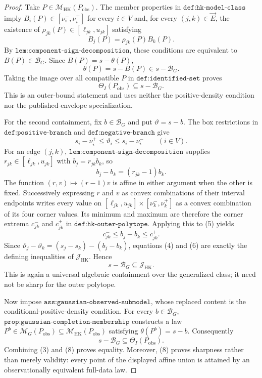 \documentclass{article}
\begin{document}
\begin{proof}
Take \(P\in\mathcal M_{\mathrm{HK}}(P_{\mathrm{obs}})\).  The member properties in \(\texttt{def:hk-model-class}\) imply \(B_i(P)\in[\nu_i^-,\nu_i^+]\) for every \(i\in V\) and, for every \((j,k)\in\vec E\), the existence of \(\rho_{jk}(P)\in[\ell_{jk},u_{jk}]\) satisfying
\[
B_j(P)=\rho_{jk}(P)B_k(P). \tag{1}
\]
By \(\texttt{lem:component-sign-decomposition}\), these conditions are equivalent to \(B(P)\in\mathcal B_G\).  Since \(B(P)=s-\theta(P)\),
\[
\theta(P)=s-B(P)\in s-\mathcal B_G. \tag{2}
\]
Taking the image over all compatible \(P\) in \(\texttt{def:identified-set}\) proves
\[
\Theta_I(P_{\mathrm{obs}})\subseteq s-\mathcal B_G. \tag{3}
\]
This is an outer-bound statement and uses neither the positive-density condition nor the published-envelope specialization.

For the second containment, fix \(b\in\mathcal B_G\) and put \(\vartheta=s-b\).  The box restrictions in \(\texttt{def:positive-branch}\) and \(\texttt{def:negative-branch}\) give
\[
s_i-\nu_i^+\le \vartheta_i\le s_i-\nu_i^-\qquad(i\in V). \tag{4}
\]
For an edge \((j,k)\), \(\texttt{lem:component-sign-decomposition}\) supplies \(r_{jk}\in[\ell_{jk},u_{jk}]\) with \(b_j=r_{jk}b_k\), so
\[
b_j-b_k=(r_{jk}-1)b_k. \tag{5}
\]
The function \((r,v)\mapsto(r-1)v\) is affine in either argument when the other is fixed.  Successively expressing \(r\) and \(v\) as convex combinations of their interval endpoints writes every value on \([\ell_{jk},u_{jk}]\times[\nu_k^-,\nu_k^+]\) as a convex combination of its four corner values.  Its minimum and maximum are therefore the corner extrema \(c_{jk}^-\) and \(c_{jk}^+\) in \(\texttt{def:hk-outer-polytope}\).  Applying this to (5) yields
\[
c_{jk}^-\le b_j-b_k\le c_{jk}^+. \tag{6}
\]
Since \(\vartheta_j-\vartheta_k=(s_j-s_k)-(b_j-b_k)\), equations (4) and (6) are exactly the defining inequalities of \(\mathcal J_{\mathrm{HK}}\).  Hence
\[
s-\mathcal B_G\subseteq\mathcal J_{\mathrm{HK}}. \tag{7}
\]
This is again a universal algebraic containment over the generalized class; it need not be sharp for the outer polytope.

Now impose \(\texttt{ass:gaussian-observed-submodel}\), whose replaced content is the conditional-positive-density condition.  For every \(b\in\mathcal B_G\), \(\texttt{prop:gaussian-completion-membership}\) constructs a law \(P^b\in\mathcal M_G(P_{\mathrm{obs}})\subseteq\mathcal M_{\mathrm{HK}}(P_{\mathrm{obs}})\) satisfying \(\theta(P^b)=s-b\).  Consequently
\[
s-\mathcal B_G\subseteq\Theta_I(P_{\mathrm{obs}}). \tag{8}
\]
Combining (3) and (8) proves equality.  Moreover, (8) proves sharpness rather than merely validity: every point of the displayed affine union is attained by an observationally equivalent full-data law.


\end{proof}
\end{document}
